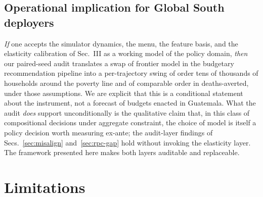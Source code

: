 \documentclass[conference]{IEEEtran}
\begin{document}
\subsection{Operational implication for Global South deployers}

\emph{If} one accepts the simulator dynamics, the menu, the feature
basis, and the elasticity calibration of Sec.~III as a working model
of the policy domain, \emph{then} our paired-seed audit translates a
swap of frontier model in the budgetary recommendation pipeline into
a per-trajectory swing of order tens of thousands of households
around the poverty line and of comparable order in deaths-averted,
under those assumptions. We are explicit that this is a conditional
statement about the instrument, not a forecast of budgets enacted in
Guatemala. What the audit \emph{does} support unconditionally is the
qualitative claim that, in this class of compositional decisions
under aggregate constraint, the choice of model is itself a policy
decision worth measuring ex-ante; the audit-layer findings of
Secs.~\ref{sec:misalign} and~\ref{sec:rpc-gap} hold without invoking
the elasticity layer. The framework presented here makes both layers
auditable and replaceable.

\section{Limitations}
\end{document}
